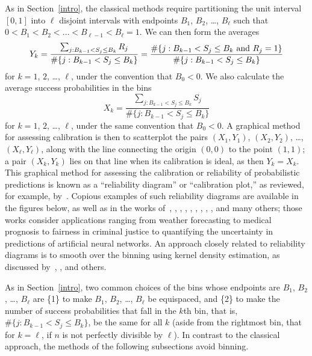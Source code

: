 \documentclass{article}
\begin{document}
As in Section~\ref{intro}, the classical methods 
require partitioning the unit interval $[0, 1]$ into $\ell$ disjoint intervals
with endpoints $B_1$, $B_2$, \dots, $B_{\ell}$ such that
$0 < B_1 < B_2 < \dots < B_{\ell-1} < B_{\ell} = 1$.
We can then form the averages
%
\begin{equation}
\label{avgY}
Y_k = \frac{\sum_{j : B_{k-1} < S_j \le B_k} R_j}
           {\#\{j : B_{k-1} < S_j \le B_k\}}
    = \frac{\#\{j : B_{k-1} < S_j \le B_k \hbox{ and } R_j = 1\}}
           {\#\{j : B_{k-1} < S_j \le B_k\}}
\end{equation}
%
for $k = 1$, $2$, \dots, $\ell$, under the convention that $B_0 < 0$.
We also calculate the average success probabilities in the bins
%
\begin{equation}
\label{avgX}
X_k = \frac{\sum_{j : B_{k-1} < S_j \le B_k} S_j}
           {\#\{j : B_{k-1} < S_j \le B_k\}}
\end{equation}
%
for $k = 1$, $2$, \dots, $\ell$, under the same convention that $B_0 < 0$.
A graphical method for assessing calibration is then to scatterplot the pairs
$(X_1, Y_1)$, $(X_2, Y_2)$, \dots, $(X_{\ell}, Y_{\ell})$,
along with the line connecting the origin $(0, 0)$ to the point $(1, 1)$;
a pair $(X_k, Y_k)$ lies on that line when its calibration is ideal,
as then $Y_k = X_k$.
This graphical method for assessing the calibration or reliability
of probabilistic predictions is known as a ``reliability diagram''
or ``calibration plot,'' as reviewed, for example, by~\cite{tygert}.
Copious examples of such reliability diagrams are available
in the figures below, as well as in the works
of~\cite{brocker}, \cite{brocker-smith},
\cite{corbett-davies-pierson-feller-goel-huq},
\cite{crowson-atkinson-therneau}, \cite{gneiting-balabdaoui-raftery},
\cite{guo-pleiss-sun-weinberger}, \cite{murphy-winkler},
\cite{vaicenavicius-widmann-andersson-lindsten-roll-schoen}, \cite{wilks},
and many others; those works consider applications ranging
from weather forecasting to medical prognosis to fairness in criminal justice
to quantifying the uncertainty in predictions of artificial neural networks.
An approach closely related to reliability diagrams is to smooth over
the binning using kernel density estimation, as discussed by~\cite{brocker},
\cite{wilks}, and others.

As in Section~\ref{intro}, two common choices of the bins
whose endpoints are $B_1$, $B_2$, \dots, $B_{\ell}$ are
\{1\} to make $B_1$, $B_2$, \dots, $B_{\ell}$ be equispaced, and
\{2\} to make the number of success probabilities that fall in the $k$th bin,
that is, $\#\{j : B_{k-1} < S_j \le B_k\}$, be the same for all $k$
(aside from the rightmost bin, that for $k = \ell$,
if $n$ is not perfectly divisible by $\ell$).
In contrast to the classical approach,
the methods of the following subsections avoid binning.
\end{document}
